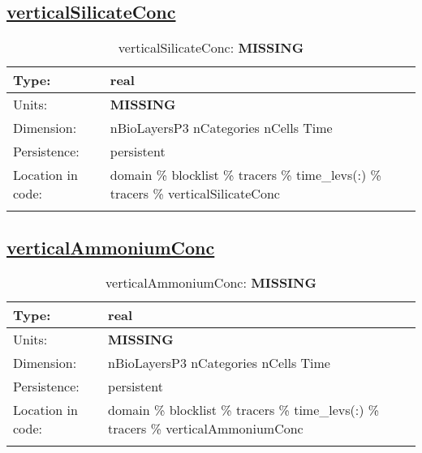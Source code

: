 \subsection[verticalSilicateConc]{\hyperref[sec:var_tab_tracers]{verticalSilicateConc}}
\label{subsec:var_sec_tracers_verticalSilicateConc}
\begin{center}
\begin{longtable}{| p{2.0in} | p{4.0in} |}
        \hline 
        Type: & real \\
        \hline 
        Units: & {\bf \color{red} MISSING} \\
        \hline 
        Dimension: & nBioLayersP3 nCategories nCells Time \\
        \hline 
        Persistence: & persistent \\
        \hline 
         Location in code: & domain \% blocklist \% tracers \% time\_levs(:) \% tracers \% verticalSilicateConc \\
         \hline 
    \caption{verticalSilicateConc: {\bf \color{red} MISSING}}
\end{longtable}
\end{center}
\subsection[verticalAmmoniumConc]{\hyperref[sec:var_tab_tracers]{verticalAmmoniumConc}}
\label{subsec:var_sec_tracers_verticalAmmoniumConc}
\begin{center}
\begin{longtable}{| p{2.0in} | p{4.0in} |}
        \hline 
        Type: & real \\
        \hline 
        Units: & {\bf \color{red} MISSING} \\
        \hline 
        Dimension: & nBioLayersP3 nCategories nCells Time \\
        \hline 
        Persistence: & persistent \\
        \hline 
         Location in code: & domain \% blocklist \% tracers \% time\_levs(:) \% tracers \% verticalAmmoniumConc \\
         \hline 
    \caption{verticalAmmoniumConc: {\bf \color{red} MISSING}}
\end{longtable}
\end{center}
